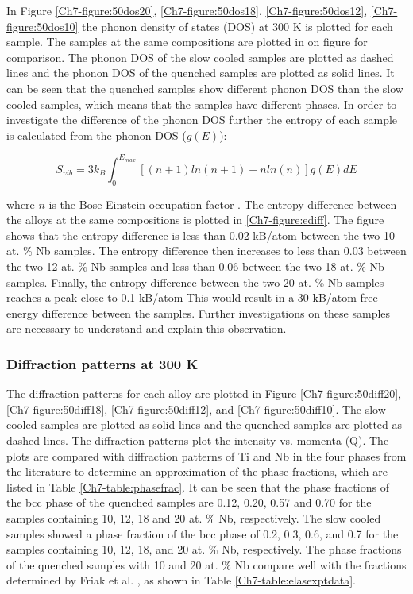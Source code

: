 In Figure \ref{Ch7-figure:50dos20}, \ref{Ch7-figure:50dos18}, \ref{Ch7-figure:50dos12}, \ref{Ch7-figure:50dos10} the phonon density of states (DOS) at 300 K is plotted for each sample. The samples at the same compositions are plotted in on figure for comparison. The phonon DOS of the slow cooled samples are plotted as dashed lines and the phonon DOS of the quenched samples are plotted as solid lines. It can be seen that the quenched samples show different phonon DOS than the slow cooled samples, which means that the samples have different phases. In order to investigate the difference of the phonon DOS further the entropy of each sample is calculated from the phonon DOS ($g(E)$):

\begin{equation}
\label{eq:phononentropy}
S_{vib} = 3 k_{B} \int_{0}^{E_{max}} \left[ \left( n+1 \right) ln\left(n+1\right) -n ln\left(n\right) \right] g(E) dE
\end{equation}

\noindent where $n$ is the Bose-Einstein occupation factor \cite{Budai2014}. The entropy difference between the alloys at the same compositions is plotted in \ref{Ch7-figure:ediff}. The figure shows that the entropy difference is less than 0.02 kB/atom between the two 10 at. \% Nb samples. The entropy difference then increases to less than 0.03 between the two 12 at. \% Nb samples and less than 0.06 between the two 18 at. \% Nb samples. Finally, the entropy difference between the two 20 at. \% Nb samples reaches a peak close to 0.1 kB/atom This would result in a 30 kB/atom free energy difference between the samples. Further investigations on these samples are necessary to understand and explain this observation.

\subsubsection{Diffraction patterns at 300 K}

The diffraction patterns for each alloy are plotted in Figure \ref{Ch7-figure:50diff20}, \ref{Ch7-figure:50diff18}, \ref{Ch7-figure:50diff12}, and \ref{Ch7-figure:50diff10}. The slow cooled samples are plotted as solid lines and the quenched samples are plotted as dashed lines. The diffraction patterns plot the intensity vs. momenta (Q). The plots are compared with diffraction patterns of Ti and Nb in the four phases from the literature to determine an approximation of the phase fractions, which are listed in Table \ref{Ch7-table:phasefrac}. It can be seen that the phase fractions of the bcc phase of the quenched samples are 0.12, 0.20, 0.57 and 0.70 for the samples containing 10, 12, 18 and 20 at. \% Nb, respectively. The slow cooled samples showed  a phase fraction of the bcc phase of 0.2, 0.3, 0.6, and 0.7 for the samples containing 10, 12, 18, and 20 at. \% Nb, respectively. The phase fractions of the quenched samples with 10 and 20 at. \% Nb compare well with the fractions determined by Friak et al. \cite{Friak2012}, as shown in Table \ref{Ch7-table:elasexptdata}. 

